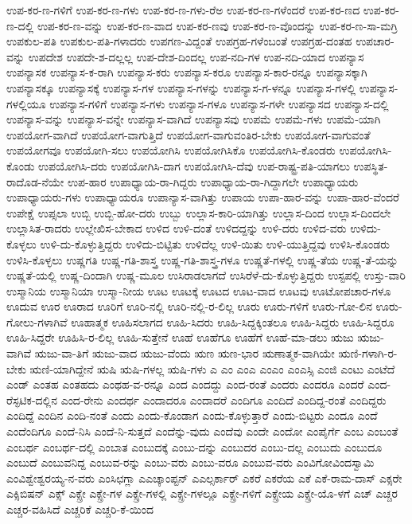 {ಉಪ-ಕರ-ಣ-ಗಳಿಗೆ
ಉಪ-ಕರ-ಣ-ಗಳು
ಉಪ-ಕರ-ಣ-ಗಳು-ರೆಅ
ಉಪ-ಕರ-ಣ-ಗಳೆಂದರೆ
ಉಪ-ಕರ-ಣದ
ಉಪ-ಕರ-ಣ-ದಲ್ಲಿ
ಉಪ-ಕರ-ಣ-ವನ್ನು
ಉಪ-ಕರ-ಣ-ವಾದ
ಉಪ-ಕರ-ಣವು
ಉಪ-ಕರ-ಣ-ವೊಂದನ್ನು
ಉಪ-ಕರ-ಣ-ಸಾ-ಮಗ್ರಿ
ಉಪಕುಲ-ಪತಿ
ಉಪಕುಲ-ಪತಿ-ಗಳಾದರು
ಉಪಗಣ-ವಿದ್ದಂತೆ
ಉಪಗ್ರಹ-ಗಳೆಂಬಂತೆ
ಉಪಗ್ರಹ-ದಂತಹ
ಉಪಚಾರ-ವನ್ನು
ಉಪದೇಶ
ಉಪದೇ-ಶ-ದಲ್ಲಲ್ಲ
ಉಪ-ದೇಶ-ದಿಂದಲ್ಲ
ಉಪ-ನದಿ-ಗಳ
ಉಪ-ನದಿ-ಯಾದ
ಉಪನ್ಯಾಸ
ಉಪನ್ಯಾಸಕ
ಉಪನ್ಯಾಸ-ಕ-ರಾಗಿ
ಉಪನ್ಯಾಸ-ಕರು
ಉಪನ್ಯಾಸ-ಕರೂ
ಉಪನ್ಯಾಸ-ಕಾರ-ರನ್ನೂ
ಉಪನ್ಯಾಸಕ್ಕಾಗಿ
ಉಪನ್ಯಾಸಕ್ಕೂ
ಉಪನ್ಯಾಸಕ್ಕೆ
ಉಪನ್ಯಾಸ-ಗಳ
ಉಪನ್ಯಾಸ-ಗಳನ್ನು
ಉಪನ್ಯಾಸ-ಗ-ಳನ್ನೂ
ಉಪನ್ಯಾಸ-ಗಳಲ್ಲಿ
ಉಪನ್ಯಾಸ-ಗಳಲ್ಲಿಯೂ
ಉಪನ್ಯಾಸ-ಗಳಿಗೆ
ಉಪನ್ಯಾಸ-ಗಳು
ಉಪನ್ಯಾಸ-ಗಳೂ
ಉಪನ್ಯಾಸ-ಗಳೇ
ಉಪನ್ಯಾಸದ
ಉಪನ್ಯಾಸ-ದಲ್ಲಿ
ಉಪನ್ಯಾಸ-ವನ್ನು
ಉಪನ್ಯಾಸ-ವನ್ನೇ
ಉಪನ್ಯಾಸ-ವಾಗಿದೆ
ಉಪನ್ಯಾಸವು
ಉಪಮೆ
ಉಪಮೆ-ಗಳು
ಉಪಮೆ-ಯಾಗಿ
ಉಪಯೋಗ-ವಾಗಿದೆ
ಉಪಯೋಗ-ವಾಗುತ್ತಿದೆ
ಉಪಯೋಗ-ವಾಗುವಂತಿರ-ಬೇಕು
ಉಪಯೋಗ-ವಾಗುವಂತೆ
ಉಪಯೋಗವೂ
ಉಪಯೋಗಿ-ಸಲು
ಉಪಯೋಗಿಸಿ
ಉಪಯೋಗಿಸಿಕೊ
ಉಪಯೋಗಿಸಿ-ಕೊಂಡರು
ಉಪಯೋಗಿಸಿ-ಕೊಂಡು
ಉಪಯೋಗಿಸಿ-ದರು
ಉಪಯೋಗಿಸಿ-ದಾಗ
ಉಪಯೋಗಿಸಿ-ದೆವು
ಉಪ-ರಾಷ್ಟ್ರ-ಪತಿ-ಯಾಗಲು
ಉಪಸ್ಥಿತ-ರಾದೊಡ-ನೆಯೇ
ಉಪ-ಹಾರ
ಉಪಾಧ್ಯಾಯ-ರಾ-ಗಿದ್ದರು
ಉಪಾಧ್ಯಾಯ-ರಾ-ಗಿದ್ದಾಗಲೇ
ಉಪಾಧ್ಯಾಯರು
ಉಪಾಧ್ಯಾಯರು-ಗಳು
ಉಪಾಧ್ಯಾಯರೂ
ಉಪಾನ್ಯಾಸ-ವಾಗಿತ್ತು
ಉಪಾಯ
ಉಪಾ-ಹಾರ-ವನ್ನು
ಉಪಾ-ಹಾರ-ವೆಂದರೆ
ಉಪೇಕ್ಷೆ
ಉಪ್ಸಲಾ
ಉಬ್ಬಿ
ಉಬ್ಬಿ-ಹೋ-ದರು
ಉಬ್ಬು
ಉಲ್ಲಾಸ-ಕಾರಿ-ಯಾಗಿತ್ತು
ಉಲ್ಲಾಸ-ದಿಂದ
ಉಲ್ಲಾಸ-ದಿಂದಲೇ
ಉಲ್ಲಾಸಿತ-ರಾದರು
ಉಲ್ಲೇಖಿಸ-ಬೇಕಾದ
ಉಳಿದ
ಉಳಿ-ದಂತೆ
ಉಳಿದದ್ದನ್ನು
ಉಳಿ-ದರು
ಉಳಿದ-ವರು
ಉಳಿದು-ಕೊಳ್ಳಲು
ಉಳಿ-ದು-ಕೊಳ್ಳುತ್ತಿದ್ದರು
ಉಳಿದು-ಬಿಟ್ಟಿತು
ಉಳಿದೆಲ್ಲ
ಉಳಿ-ಯಿತು
ಉಳಿ-ಯುತ್ತಿದ್ದವು
ಉಳಿಸಿ-ಕೊಂಡರು
ಉಳಿಸಿ-ಕೊಳ್ಳಲು
ಉಷ್ಣಗತಿ
ಉಷ್ಣ-ಗತಿ-ಶಾಸ್ತ್ರ
ಉಷ್ಣ-ಗತಿ-ಶಾಸ್ತ್ರ-ಗಳೂ
ಉಷ್ಣತೆ-ಗಳಲ್ಲಿ
ಉಷ್ಣ-ತೆಯ
ಉಷ್ಣ-ತೆ-ಯನ್ನು
ಉಷ್ಣತೆ-ಯಲ್ಲಿ
ಉಷ್ಣ-ದಿಂದಾಗಿ
ಉಷ್ಣ-ಮೂಲ
ಉಸಿರಾಡಲಾಗದೆ
ಉಸಿರೆಳೆ-ದು-ಕೊಳ್ಳುತ್ತಿದ್ದರು
ಉಸ್ಟಪಲ್ಲಿ
ಉಸ್ತು-ವಾರಿ
ಉಸ್ಮಾನಿಯ
ಉಸ್ಮಾನಿಯಾ
ಉಸ್ಮಾ-ನೀಯ
ಊಟ
ಊಟಕ್ಕೆ
ಊಟದ
ಊಟ-ವಾದ
ಊಟವು
ಊಟೋಪಚಾರ-ಗಳೂ
ಊದುವ
ಊರ
ಊರಾದ
ಊರಿಗೆ
ಊರಿ-ನಲ್ಲಿ
ಊರಿ-ನಲ್ಲಿ-ರ-ಲಿಲ್ಲ
ಊರು
ಊರು-ಗಳಿಗೆ
ಊರು-ಗೋ-ಲಿನ
ಊರು-ಗೋಲು-ಗಳಾಗಿವೆ
ಊಹಾತ್ಮಕ
ಊಹಿಸಲಾಗದ
ಊಹಿ-ಸಿದರು
ಊಹಿ-ಸಿದ್ದಕ್ಕಿಂತಲೂ
ಊಹಿ-ಸಿದ್ದರು
ಊಹಿ-ಸಿದ್ದರೂ
ಊಹಿ-ಸಿದ್ದರೇ
ಊಹಿಸಿ-ರ-ಲಿಲ್ಲ
ಊಹಿ-ಸುತ್ತೇನೆ
ಊಹೆ
ಊಹೆಗೂ
ಊಹೆಗೆ
ಊಹೆ-ಮಾ-ಡಲು
ಋಜು
ಋಜು-ವಾಗಿವೆ
ಋಜು-ವಾ-ತಿಗೆ
ಋಜು-ವಾದ
ಋಜು-ವೆಂದು
ಋಣ
ಋಣ-ಭಾರ
ಋಣಾತ್ಮಕ-ವಾಗಿಯೇ
ಋಣಿ-ಗಳಾಗಿ-ರ-ಬೇಕು
ಋಣಿ-ಯಾಗಿದ್ದೇನೆ
ಋಷಿ
ಋಷಿ-ಗಳಲ್ಲ
ಋಷಿ-ಗಳು
ಎ
ಎಂ
ಎಂಎ
ಎಂಎಂ
ಎಂಎಸ್ಸಿ
ಎಂಜಿ
ಎಂಟು
ಎಂಟೆದೆ
ಎಂಡ್
ಎಂತಹ
ಎಂತಹದು
ಎಂಥಹ-ವ-ರನ್ನೂ
ಎಂದ
ಎಂದದ್ದು
ಎಂದ-ರಂತೆ
ಎಂದರು
ಎಂದರೂ
ಎಂದರೆ
ಎಂದ-ರೆಸ್ಫಟಿಕ-ದಲ್ಲಿನ
ಎಂದ-ರೇನು
ಎಂದರ್ಥ
ಎಂದಾದರೂ
ಎಂದಾದರೆ
ಎಂದಿಗೂ
ಎಂದಿದೆ
ಎಂದಿದ್ದ-ರಂತೆ
ಎಂದಿದ್ದರು
ಎಂದಿದ್ದೆ
ಎಂದಿನ
ಎಂದಿ-ನಂತೆ
ಎಂದು
ಎಂದು-ಕೊಂಡಾಗ
ಎಂದು-ಕೊಳ್ಳುತ್ತಾರೆ
ಎಂದು-ಬಿಟ್ಟರು
ಎಂದೂ
ಎಂದೆ
ಎಂದೆಂದಿಗೂ
ಎಂದೆ-ನಿಸಿ
ಎಂದೆ-ನಿ-ಸುತ್ತದೆ
ಎಂದೆನ್ನು-ವುದು
ಎಂದೆವು
ಎಂದೇ
ಎಂದೋ
ಎಂಪೈರ್ಗೆ
ಎಂಬ
ಎಂಬಂತೆ
ಎಂಬರ್ಥ
ಎಂಬರ್ಥ-ದಲ್ಲಿ
ಎಂಬಾತ
ಎಂಬುದಕ್ಕೆ
ಎಂಬು-ದನ್ನು
ಎಂಬುದರ
ಎಂಬು-ದಲ್ಲ
ಎಂಬುದು
ಎಂಬುದೂ
ಎಂಬುದೆ
ಎಂಬುವನಿದ್ದ
ಎಂಬುವ-ರನ್ನು
ಎಂಬು-ವರು
ಎಂಬು-ವರೂ
ಎಂಬುವ-ವರು
ಎಂವಿಗೋವಿಂದಸ್ವಾಮಿ
ಎಂವಿಶ್ವೇಶ್ವರಯ್ಯ-ನ-ವರು
ಎಂಸಿಛಗ್ಲಾ
ಎಎಚ್ಕಾಂಪ್ಟನ್
ಎಎಲ್ಸರ್ಕಾರ್
ಎಕರೆ
ಎಕರೆಯ
ಎಕೆ
ಎಕೆ-ರಾಮ-ದಾಸ್
ಎಕ್ಸರೇ
ಎಕ್ಸಿಬಿಷನ್
ಎಕ್ಸ್
ಎಕ್ಸ್ರೇ
ಎಕ್ಸ್ರೇ-ಗಳ
ಎಕ್ಸ್ರೇ-ಗಳಲ್ಲಿ
ಎಕ್ಸ್ರೇ-ಗಳಲ್ಲೂ
ಎಕ್ಸ್ರೇ-ಗಳಿಗೆ
ಎಕ್ಸ್ರೇಯ
ಎಕ್ಸ್ರೇ-ಯೊ-ಳಗೆ
ಎಚ್
ಎಚ್ಚರ
ಎಚ್ಚರ-ವಹಿಸಿದೆ
ಎಚ್ಚರಿಕೆ
ಎಚ್ಚರಿ-ಕೆ-ಯಿಂದ
}

